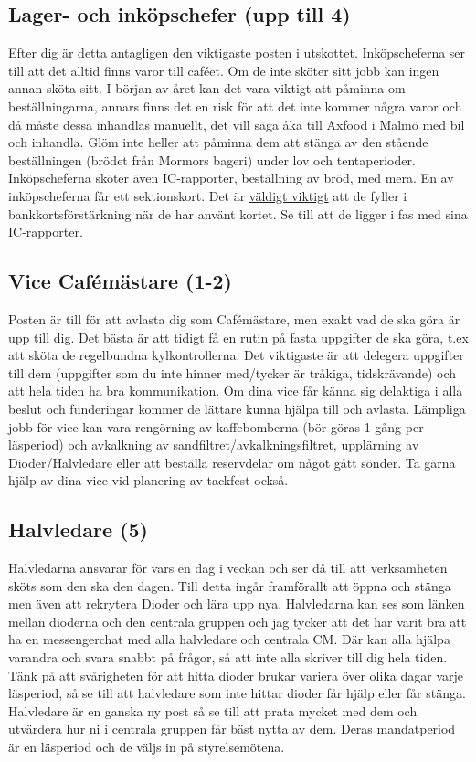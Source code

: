 \documentclass[10pt]{article}
\begin{document}
\subsection{Lager- och inköpschefer (upp till 4)}
Efter dig är detta antagligen den viktigaste posten i utskottet. Inköpscheferna ser till att det alltid finns varor till caféet. Om de inte sköter sitt jobb kan ingen annan sköta sitt. I början av året kan det vara viktigt att påminna om beställningarna, annars finns det en risk för att det inte kommer några varor och då måste dessa inhandlas manuellt, det vill säga åka till Axfood i Malmö med bil och inhandla. Glöm inte heller att påminna dem att stänga av den stående beställningen (brödet från Mormors bageri) under lov och tentaperioder. Inköpscheferna sköter även IC-rapporter, beställning av bröd, med mera. En av inköpscheferna får ett sektionskort. Det är \underline{väldigt viktigt} att de fyller i bankkortsförstärkning när de har använt kortet. Se till att de ligger i fas med sina IC-rapporter.

\subsection{Vice Cafémästare (1-2)}
Posten är till för att avlasta dig som Cafémästare, men exakt vad de ska göra är upp till dig. Det bästa är att tidigt få en rutin på fasta uppgifter de ska göra, t.ex att sköta de regelbundna kylkontrollerna. Det viktigaste är att delegera uppgifter till dem (uppgifter som du inte hinner med/tycker är tråkiga, tidskrävande) och att hela tiden ha bra kommunikation. Om dina vice får känna sig delaktiga i alla beslut och funderingar kommer de lättare kunna hjälpa till och avlasta.  Lämpliga jobb för vice kan vara rengörning av kaffebomberna (bör göras 1 gång per läsperiod) och avkalkning av sandfiltret/avkalkningsfiltret, upplärning av Dioder/Halvledare eller att beställa reservdelar om något gått sönder. Ta gärna hjälp av dina vice vid planering av tackfest också.

\subsection{Halvledare (5)}
Halvledarna ansvarar för vars en dag i veckan och ser då till att verksamheten sköts som den ska den dagen. Till detta ingår framförallt att öppna och stänga men även att rekrytera Dioder och lära upp nya. Halvledarna kan ses som länken mellan dioderna och den centrala gruppen och jag tycker att det har varit bra att ha en messengerchat med alla halvledare och centrala CM. Där kan alla hjälpa varandra och svara snabbt på frågor, så att inte alla skriver till dig hela tiden. Tänk på att svårigheten för att hitta dioder brukar variera över olika dagar varje läsperiod, så se till att halvledare som inte hittar dioder får hjälp eller får stänga. Halvledare är en ganska ny post så se till att prata mycket med dem och utvärdera hur ni i centrala gruppen får bäst nytta av dem. Deras mandatperiod är en läsperiod och de väljs in på styrelsemötena.
\end{document}
